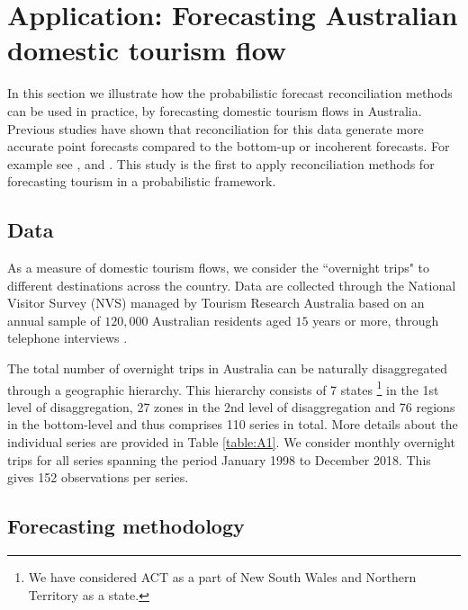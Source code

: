 \documentclass[12pt]{article}
\theoremstyle{definition}
\begin{document}
\section{Application: Forecasting Australian domestic tourism flow}\label{sec:Application}

In this section we illustrate how the probabilistic forecast reconciliation methods can be used in practice, by forecasting domestic tourism flows in Australia. Previous studies have shown that reconciliation for this data generate more accurate point forecasts compared to the bottom-up or incoherent forecasts. For example see \citet{AthEtAl2009}, \citet{HynEtAl2011} and \citet{WicEtAl2019}. This study is the first to apply reconciliation methods for forecasting tourism in a probabilistic framework.

\subsection{Data}
As a measure of domestic tourism flows, we consider the ``overnight trips" to different destinations across the country.
Data are collected through the National Visitor Survey (NVS) managed by Tourism Research Australia based on an annual sample of $120,000$ Australian residents aged $15$ years or more, through telephone interviews \citep{TourismResearch2019}.

The total number of overnight trips in Australia can be naturally disaggregated through a geographic hierarchy. This hierarchy consists of 7 states \footnote{We have considered ACT as a part of New South Wales and Northern Territory as a state.} in the 1st level of disaggregation, 27 zones in the 2nd level of disaggregation and 76 regions in the bottom-level and thus comprises 110 series in total. More details about the individual series are provided in Table \ref{table:A1}.
We consider monthly overnight trips for all series spanning the period January 1998 to December 2018. This gives 152 observations per series.

\subsection{Forecasting methodology}
\end{document}

